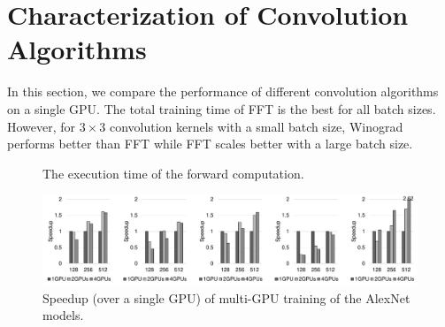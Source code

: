 

\section{Characterization of Convolution Algorithms}

In this section, we compare the performance of different convolution algorithms on a single GPU. The total training time of \textsf{FFT} is the best for all batch sizes. However, for $3 \times 3$ convolution kernels with a small batch size, \textsf{Winograd} performs better than \textsf{FFT} while \textsf{FFT} scales better with a large batch size. 

\begin{figure}[htbp]
  \centering



  \caption{The execution time of the forward computation.}
  \label{fig_layerwise}
\end{figure}

\begin{figure}[htbp]
  \centering
  \includegraphics[width=.8\linewidth]{./figures/MG}
  \subfloat[Caffe]{\makebox[.16\linewidth][]{}}
  \subfloat[Torch]{\makebox[.17\linewidth][]{}}
  \subfloat[TensorFlow]{\makebox[.16\linewidth][]{}}
  \subfloat[CNTK]{\makebox[.16\linewidth][]{}}
\caption{Speedup (over a single GPU) of multi-GPU training of the AlexNet models.}
\label{fig_mg}
\end{figure}

